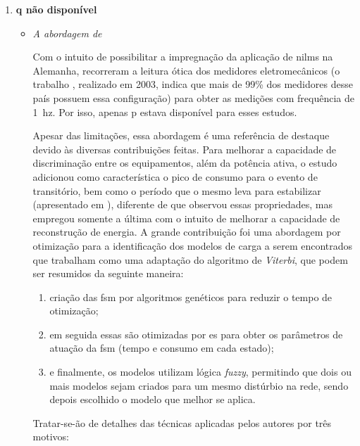 \begin{enumerate}[label=\textbf{1.\arabic*},wide=\parindent]
\begin{enumerate}[label*=.\textbf{\arabic*},wide=\parindent]
\item \textbf{\Acrlong{q} não disponível}

\begin{itemize}[wide=\parindent]
\item \emph{A abordagem de
\citeauthor*{nilm_baranski_genetic_base_2003_19}}

Com o intuito de possibilitar a impregnação da aplicação de \glspl{nilm}
na Alemanha, \citet*{nilm_baranski_genetic_base_2003_19,
nilm_baranski_genetic_detalhado_2004_20,nilm_baranski_summary_2004_21}
recorreram a leitura ótica dos medidores eletromecânicos
(o trabalho \cite{nilm_baranski_genetic_base_2003_19}, realizado em
2003, indica que mais de 99\% dos medidores desse país possuem essa
configuração) para obter as medições com frequência de
1~\acs{hz}. Por isso, apenas \gls{p} estava disponível para esses
estudos.

Apesar das limitações, essa abordagem é uma referência de destaque
devido às diversas contribuições feitas. Para melhorar a capacidade de
discriminação entre os equipamentos, além da potência ativa, o estudo
adicionou como característica o pico de consumo para o evento de
transitório, bem como o período que o mesmo leva para estabilizar
(apresentado em \cite{nilm_baranski_genetic_detalhado_2004_20}),
diferente de \cite{nilm_cole_data_extraction_1998_14,
nilm_cole_extra_info_surge_1998_15} que observou essas propriedades,
mas empregou somente a última com o intuito de melhorar a
capacidade de reconstrução de energia. A grande contribuição foi uma
abordagem por otimização para a identificação dos modelos de carga a
serem encontrados que trabalham como uma adaptação do algoritmo de
\emph{Viterbi}, que podem ser resumidos da seguinte maneira:

\begin{enumerate}
\item criação das \gls{fsm} por algoritmos genéticos
para reduzir o tempo de otimização;
\item em seguida essas são otimizadas por \gls{es} para obter os
parâmetros de atuação da \gls{fsm} (tempo e consumo em cada estado);
\item e finalmente, os modelos utilizam lógica \emph{fuzzy}, permitindo que
dois ou mais modelos sejam criados para um mesmo distúrbio na rede,
sendo depois escolhido o modelo que melhor se aplica.
\end{enumerate}

Tratar-se-ão de detalhes das técnicas aplicadas pelos autores por três
motivos:


\end{itemize}
\end{enumerate}
\end{enumerate}
